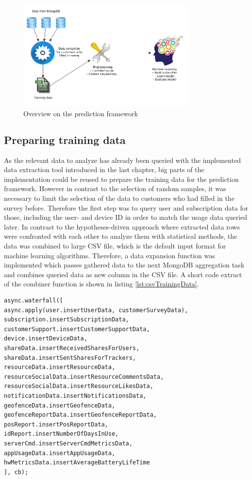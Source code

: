 \begin{figure}
	\centering
	\includegraphics[width=0.8\textwidth]{img/frameworkOverview.png}
	\caption{Overview on the prediction framework}
	\label{fig:frameworkOverview}
\end{figure} 

\subsection{Preparing training data}
As the relevant data to analyze has already been queried with the implemented data extraction tool introduced in the last chapter, big parts of the implementation could be reused to prepare the training data for the prediction framework. However in contrast to the selection of random samples, it was necessary to limit the selection of the data to customers who had filled in the survey before. Therefore the first step was to query user and subscription data for those, including the user- and device ID in order to match the usage data queried later. In contrast to the hypotheses-driven approach where extracted data rows were confronted with each other to analyze them with statistical methods, the data was combined to large CSV file, which is the default input format for machine learning algorithms. Therefore, a data expansion function was implemented which passes gathered data to the next MongoDB aggregation task and combines queried data as new column in the CSV file. A short code extract of the combiner function is shown in listing \ref{lst:csvTrainingData}. 

\begin{lstlisting}[caption={Expanding CSV data with results from MongoDB aggregation queries}, label={lst:aggregationServerCommands}]
async.waterfall([
async.apply(user.insertUserData, customerSurveyData),
subscription.insertSubscriptionData,
customerSupport.insertCustomerSupportData,
device.insertDeviceData,
shareData.insertReceivedSharesForUsers,
shareData.insertSentSharesForTrackers,
resourceData.insertResourceData,
resourceSocialData.insertResourceCommentsData,
resourceSocialData.insertResourceLikesData,
notificationData.insertNotificationsData,
geofenceData.insertGeofenceData,
geofenceReportData.insertGeofenceReportData,
posReport.insertPosReportData,
idReport.insertNumberOfDaysInUse,
serverCmd.insertServerCmdMetricsData,
appUsageData.insertAppUsageData,
hwMetricsData.insertAverageBatteryLifeTime
], cb);
\end{lstlisting}

